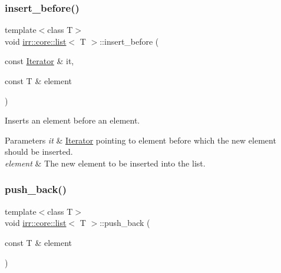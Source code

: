\subsubsection{\texorpdfstring{insert\+\_\+before()}{insert\_before()}\hspace{0.1cm}{\footnotesize\ttfamily [2/2]}}
{\footnotesize\ttfamily template$<$class T$>$ \\
void \hyperlink{classirr_1_1core_1_1list}{irr\+::core\+::list}$<$ T $>$\+::insert\+\_\+before (\begin{DoxyParamCaption}\item[{const \hyperlink{classirr_1_1core_1_1list_1_1Iterator}{Iterator} \&}]{it,  }\item[{const T \&}]{element }\end{DoxyParamCaption})\hspace{0.3cm}{\ttfamily [inline]}}



Inserts an element before an element. 


\begin{DoxyParams}{Parameters}
{\em it} & \hyperlink{classirr_1_1core_1_1list_1_1Iterator}{Iterator} pointing to element before which the new element should be inserted. \\
\hline
{\em element} & The new element to be inserted into the list. \\
\hline
\end{DoxyParams}
\mbox{\label{classirr_1_1core_1_1list_a0f73ebd87279766f339cb1462c2a24d1}} 
\subsubsection{\texorpdfstring{push\+\_\+back()}{push\_back()}\hspace{0.1cm}{\footnotesize\ttfamily [1/2]}}
{\footnotesize\ttfamily template$<$class T$>$ \\
void \hyperlink{classirr_1_1core_1_1list}{irr\+::core\+::list}$<$ T $>$\+::push\+\_\+back (\begin{DoxyParamCaption}\item[{const T \&}]{element }\end{DoxyParamCaption})\hspace{0.3cm}{\ttfamily [inline]}}




